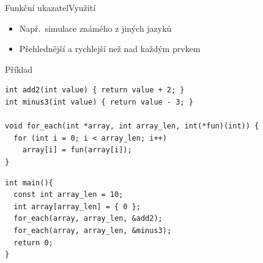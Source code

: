 \begin{frame}[fragile]{Funkční ukazatel}{Využití}

  \begin{itemize}
    \item Např.\ simulace  známého z jiných jazyků
    \item Přehlednější a rychlejší než  nad každým prvkem
  \end{itemize}

  \pause

\begin{block}{Příklad}
\begin{lstlisting}[belowskip=0pt]
int add2(int value) { return value + 2; }
int minus3(int value) { return value - 3; }

void for_each(int *array, int array_len, int(*fun)(int)) {
  for (int i = 0; i < array_len; i++)
    array[i] = fun(array[i]);
}
\end{lstlisting}
\pause
\begin{lstlisting}[aboveskip=0pt]
int main(){
  const int array_len = 10;
  int array[array_len] = { 0 };
  for_each(array, array_len, &add2);
  for_each(array, array_len, &minus3);
  return 0;
}
\end{lstlisting}
\end{block}

\end{frame}

